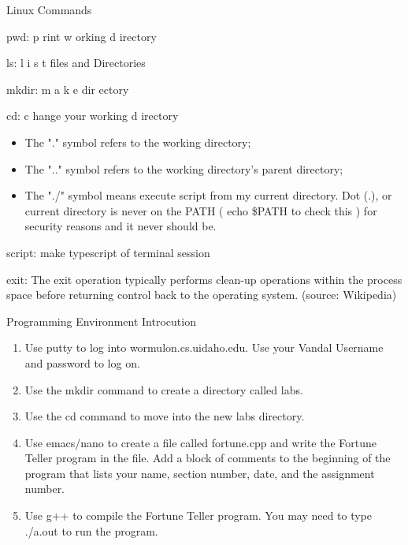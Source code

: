 \documentclass[presentation]{beamer}
\begin{document}
\begin{frame}[label=sec-4]{Linux Commands}
\begin{block}{\alert{pwd}:  \alert{p} rint \alert{w} orking \alert{d} irectory}
\end{block}
\begin{block}{\alert{ls}:  \alert{l} i \alert{s} t files and Directories}
\end{block}
\begin{block}{\alert{mkdir}:  \alert{m} a \alert{k} e \alert{dir} ectory}
\end{block}
\begin{block}{\alert{cd}:  \alert{c} hange your working \alert{d} irectory}
\begin{itemize}
\item The "\alert{.}" symbol refers to the working directory;
\item The "\alert{..}" symbol refers to the working directory's parent directory;
\item The "\alert{./}" symbol means execute script from my current directory. Dot (\alert{.}), or current directory is never on the \alert{PATH} ( \alert{echo \$PATH} to check this ) for security reasons and it never should be.
\end{itemize}
\end{block}
\begin{block}{\alert{script}: make typescript of terminal session}
\end{block}
\begin{block}{\alert{exit}: The exit operation typically performs clean-up operations within the process space before returning control back to the operating system. (source: Wikipedia)}
\end{block}
\end{frame}

\begin{frame}[label=sec-5]{Programming Environment Introcution}
\begin{enumerate}
\item Use \alert{putty} to log into \alert{wormulon.cs.uidaho.edu}. Use your \alert{Vandal Username} and \alert{password} to log on.
\item Use the \alert{mkdir} command to create a directory called \alert{labs}.
\item Use the \alert{cd} command to move into the new \alert{labs} directory.
\item Use emacs/nano to create a file called \alert{fortune.cpp} and write the Fortune Teller program in the file. Add a block of comments to the beginning of the program that lists your name, section number, date, and the assignment number.
\item Use \alert{g++} to compile the Fortune Teller program. You may need to type \alert{./a.out} to run the program.
\end{enumerate}
\end{frame}
\end{document}
